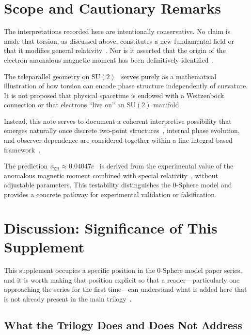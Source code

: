 \documentclass[12pt,letterpaper]{article}
\begin{document}
\section{Scope and Cautionary Remarks}

\justifying
The interpretations recorded here are intentionally conservative. No claim is made that torsion, as discussed above, constitutes a new fundamental field or that it modifies general relativity~\cite{Aldrovandi2013}. Nor is it asserted that the origin of the electron anomalous magnetic moment has been definitively identified~\cite{hanamura17765409}.

The teleparallel geometry on $\mathrm{SU}(2)$~\cite{Weitzenbock1923,Aldrovandi2013} serves purely as a mathematical illustration of how torsion can encode phase structure independently of curvature. It is not proposed that physical spacetime is endowed with a Weitzenb\"{o}ck connection or that electrons ``live on'' an $\mathrm{SU}(2)$ manifold.

Instead, this note serves to document a coherent interpretive possibility that emerges naturally once discrete two-point structures~\cite{hanamura16759284}, internal phase evolution, and observer dependence are considered together within a line-integral-based framework~\cite{hanamura18067760,hanamura18135855,hanamura18203433}.

The prediction $v_{\mathrm{ZB}} \approx 0.04047c$~\cite{hanamura18356895} is derived from the experimental value of the anomalous magnetic moment combined with special relativity~\cite{hanamura17765409}, without adjustable parameters. This testability distinguishes the 0-Sphere model and provides a concrete pathway for experimental validation or falsification.


\section{Discussion: Significance of This Supplement}

\justifying
This supplement occupies a specific position in the 0-Sphere model paper series, and it is worth making that position explicit so that a reader---particularly one approaching the series for the first time---can understand what is added here that is not already present in the main trilogy~\cite{hanamura18067760,hanamura18135855,hanamura18203433}.

\subsection{What the Trilogy Does and Does Not Address}
\end{document}
